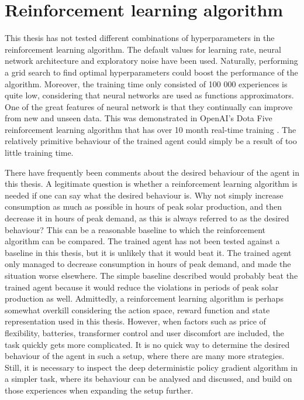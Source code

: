 \documentclass[class=book, crop=false]{standalone}
\begin{document}
\section{Reinforcement learning algorithm}
This thesis has not tested different combinations of hyperparameters in the reinforcement learning algorithm. The default values for learning rate, neural network architecture and exploratory noise have been used. Naturally, performing a grid search to find optimal hyperparameters could boost the performance of the algorithm. Moreover, the training time only consisted of 100 000 experiences is quite low, considering that neural networks are used as functions approximators. One of the great features of neural network is that they continually can improve from new and unseen data. This was demonstrated in OpenAI's Dota Five reinforcement learning algorithm that has over 10 month real-time training \cite{openai_dota}. The relatively primitive behaviour of the trained agent could simply be a result of too little training time.

There have frequently been comments about the desired behaviour of the agent in this thesis. A legitimate question is whether a reinforcement learning algorithm is needed if one can say what the desired behaviour is. Why not simply increase consumption as much as possible in hours of peak solar production, and then decrease it in hours of peak demand, as this is always referred to as the desired behaviour? This can be a reasonable baseline to which the reinforcement algorithm can be compared. The trained agent has not been tested against a baseline in this thesis, but it is unlikely that it would beat it. The trained agent only managed to decrease consumption in hours of peak demand, and made the situation worse elsewhere. The simple baseline described would probably beat the trained agent because it would reduce the violations in periods of peak solar production as well. Admittedly, a reinforcement learning algorithm is perhaps somewhat overkill considering the action space, reward function and state representation used in this thesis. However, when factors such as price of flexibility, batteries, transformer control and user discomfort are included, the task quickly gets more complicated. It is no quick way to determine the desired behaviour of the agent in such a setup, where there are many more strategies. Still, it is necessary to inspect the deep deterministic policy gradient algorithm in a simpler task, where its behaviour can be analysed and discussed, and build on those experiences when expanding the setup further. 
\end{document}
